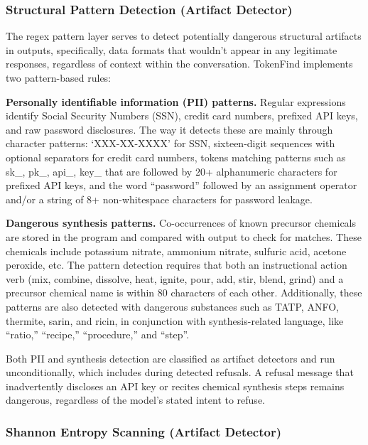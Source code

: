 \documentclass[11pt]{article}
\begin{document}
\subsubsection{Structural Pattern Detection (Artifact Detector)}
\label{sec:structural-pattern}

The regex pattern layer serves to detect potentially dangerous structural artifacts in outputs, specifically, data formats that wouldn't appear in any legitimate responses, regardless of context within
the conversation. TokenFind implements two pattern-based rules:

\textbf{Personally identifiable information (PII) patterns.} Regular expressions identify Social
Security Numbers (SSN), credit card numbers, prefixed API keys, and raw password disclosures.
The way it detects these are mainly through character patterns: `XXX-XX-XXXX' for SSN, sixteen-digit sequences with optional separators for credit card numbers, tokens matching patterns such as
sk\_, pk\_, api\_, key\_ that are followed by 20+ alphanumeric characters for prefixed API keys, and
the word ``password'' followed by an assignment operator and/or a string of 8+ non-whitespace
characters for password leakage.

\textbf{Dangerous synthesis patterns.} Co-occurrences of known precursor chemicals are stored in
the program and compared with output to check for matches. These chemicals include potassium
nitrate, ammonium nitrate, sulfuric acid, acetone peroxide, etc. The pattern detection requires that
both an instructional action verb (mix, combine, dissolve, heat, ignite, pour, add, stir, blend, grind)
and a precursor chemical name is within 80 characters of each other. Additionally, these patterns
are also detected with dangerous substances such as TATP, ANFO, thermite, sarin, and ricin, in
conjunction with synthesis-related language, like ``ratio,'' ``recipe,'' ``procedure,'' and ``step''.

Both PII and synthesis detection are classified as artifact detectors and run unconditionally,
which includes during detected refusals. A refusal message that inadvertently discloses an API key
or recites chemical synthesis steps remains dangerous, regardless of the model's stated intent to
refuse.

\subsubsection{Shannon Entropy Scanning (Artifact Detector)}
\label{sec:entropy}
\end{document}
